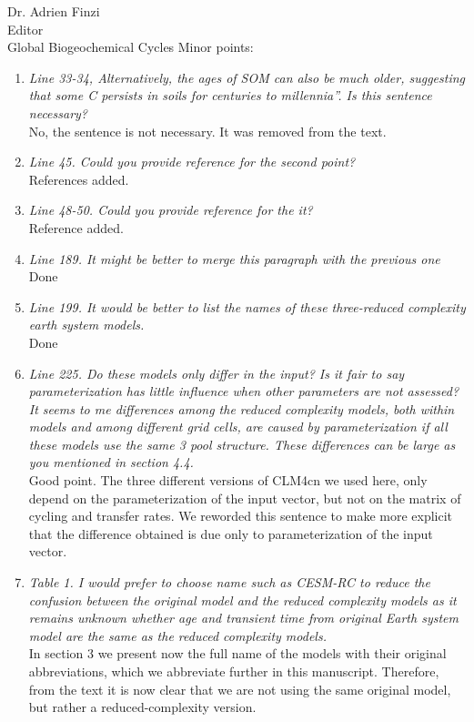 \documentclass[11pt]{bgcletter}
\begin{document}
\begin{letter}{Dr. Adrien Finzi\\
 Editor \\ Global Biogeochemical Cycles}
Minor points:
\begin{enumerate}
\item {\it Line 33-34, Alternatively, the ages of SOM can also be much older, suggesting that some C persists in soils for centuries to millennia''. Is this sentence necessary?} \\
	{\color{blue} No, the sentence is not necessary. It was removed from the text.}
\item {\it Line 45. Could you provide reference for the second point? } \\
	{\color{blue} References added.}
\item {\it Line 48-50. Could you provide reference for the it? } \\
	{\color{blue} Reference added.}
\item {\it Line 189. It might be better to merge this paragraph with the previous one } \\
	{\color{blue} Done}
\item {\it Line 199. It would be better to list the names of these three-reduced complexity earth system models. } \\
	{\color{blue} Done}
\item {\it Line 225. Do these models only differ in the input? Is it fair to say parameterization has little influence when other parameters are not assessed? It seems to me differences among the reduced complexity models, both within models and among different grid cells, are caused by parameterization if all these models use the same 3 pool structure. These differences can be large as you mentioned in section 4.4.} \\
	{\color{blue} Good point. The three different versions of CLM4cn we used here, only depend on the parameterization of the input vector, but not on the matrix of cycling and transfer rates. We reworded this sentence to make more explicit that the difference obtained is due only to parameterization of the input vector. }
\item {\it Table 1. I would prefer to choose name such as CESM-RC to reduce the confusion between the original model and the reduced complexity models as it remains unknown whether age and transient time from original Earth system model are the same as the reduced complexity models. } \\
	{\color{blue} In section 3 we present now the full name of the models with their original abbreviations, which we abbreviate further in this manuscript. Therefore, from the text it is now clear that we are not using the same original model, but rather a reduced-complexity version.}

\end{enumerate}
\end{letter}
\end{document}
